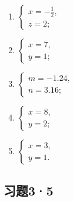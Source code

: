 \begin{enumerate}[start=1]
\item
  \(\left\{ \begin{array}{l} x = -\frac{1}{2}, \\ z = 2; \end{array} \right.\)
\item
  \(\left\{ \begin{array}{l} x = 7, \\ y = 1; \end{array} \right.\)
\item
  \(\left\{ \begin{array}{l} m = -1.24, \\ n = 3.16; \end{array} \right.\)
\item
  \(\left\{ \begin{array}{l} x = 8, \\ y = 2; \end{array} \right.\)
\item
  \(\left\{ \begin{array}{l} x = 3, \\ y = 1. \end{array} \right.\)
\end{enumerate}

\subsection{习题3·5}

